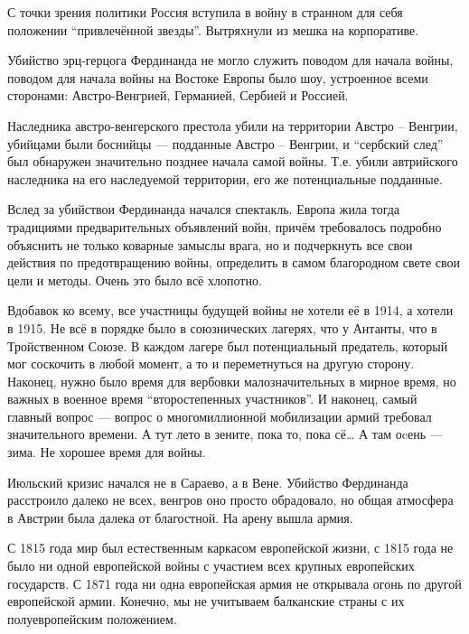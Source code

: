 С точки зрения политики Россия вступила в войну в странном для себя положении
\enquote{привлечённой звезды}. Вытряхнули из мешка на корпоративе.

Убийство эрц-герцога Фердинанда не могло служить поводом для начала войны,
поводом для начала войны на Востоке Европы было шоу, устроенное всеми сторонами:
Австро-Венгрией, Германией, Сербией и Россией.

Наследника австро-венгерского престола убили на территории Австро -- Венгрии,
убийцами были боснийцы --- подданные Австро -- Венгрии, и \enquote{сербский след}
был обнаружен значительно позднее начала самой войны. Т.е. убили автрийского
наследника на его наследуемой территории, его же потенциальные подданные.

Вслед за убийствои Фердинанда начался спектакль. Европа жила тогда традициями
предварительных объявлений войн, причём требовалось подробно объяснить не только
коварные замыслы врага, но и подчеркнуть все свои действия по предотвращению
войны, определить в самом благородном свете свои цели и методы. Очень это было
всё хлопотно.

Вдобавок ко всему, все участницы будущей войны не хотели её в 1914, а хотели в
1915. Не всё в порядке было в союзнических лагерях, что у Антанты, что в
Тройственном Союзе. В каждом лагере был потенциальный предатель, который мог
соскочить в любой момент, а то и переметнуться на другую сторону. Наконец, нужно
было время для вербовки малозначительных в мирное время, но важных в военное
время \enquote{второстепенных участников}. И наконец, самый главный вопрос ---
вопрос о многомиллионной мобилизации армий требовал значительного времени. А тут
лето в зените, пока то, пока сё\ldots{} А там оcень --- зима. Не хорошее время для
войны.

Июльский кризис начался не в Сараево, а в Вене. Убийство Фердинанда расстроило
далеко не всех, венгров оно просто обрадовало, но общая атмосфера в Австрии была
далека от благостной. На арену вышла армия.

С 1815 года мир был естественным каркасом европейской жизни, с 1815 года не было
ни одной европейской войны с участием всех крупных европейских государств. С
1871 года ни одна европейская армия не открывала огонь по другой европейской
армии. Конечно, мы не учитываем балканские страны с их полуевропейским
положением.

